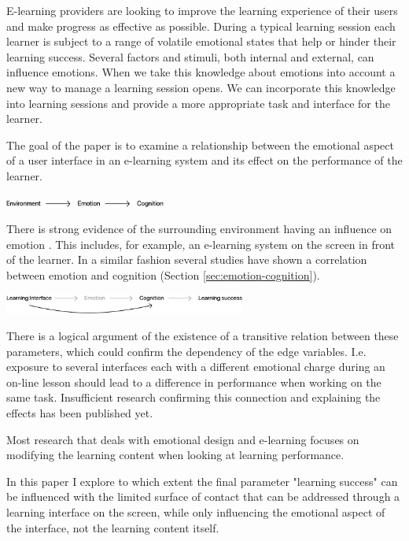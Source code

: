 E-learning providers are looking to improve the learning experience of their users and make progress as effective as possible. 
During a typical learning session each learner is subject to a range of volatile emotional states that help or hinder their learning success. 
Several factors and stimuli, both internal and external, can influence emotions. 
When we take this knowledge about emotions into account a new way to manage a learning session opens. We can incorporate this knowledge into learning sessions and provide a more appropriate task and interface for the learner.

The goal of the paper is to examine a relationship between the emotional aspect of a user interface in an e-learning system and its effect on the performance of the learner.


\begin{center}
	\includegraphics[width=200px]{graphics/relation1.png}
\end{center}
 
There is strong evidence of the surrounding environment having an influence on emotion \cite{Johnson2000, Arockiam2013, Bertamini2013}. This includes, for example, an e-learning system on the screen in front of the learner. In a similar fashion several studies have shown a correlation between emotion and cognition (Section \ref{sec:emotion-cognition}).

\begin{center}
\includegraphics[width=300px]{graphics/relation2.png}
\end{center}

There is a logical argument of the existence of a transitive relation between these parameters, which could confirm the dependency of the edge variables. 
I.e. exposure to several interfaces each with a different emotional charge during an on-line lesson should lead to a difference in performance when working on the same task.
Insufficient research confirming this connection and explaining the effects has been published yet. 

Most research that deals with emotional design and e-learning focuses on modifying the learning content when looking at learning performance.

In this paper I explore to which extent the final parameter "learning success" can be influenced with the limited surface of contact that can be addressed through a learning interface on the screen, while only influencing the emotional aspect of the interface, not the learning content itself.